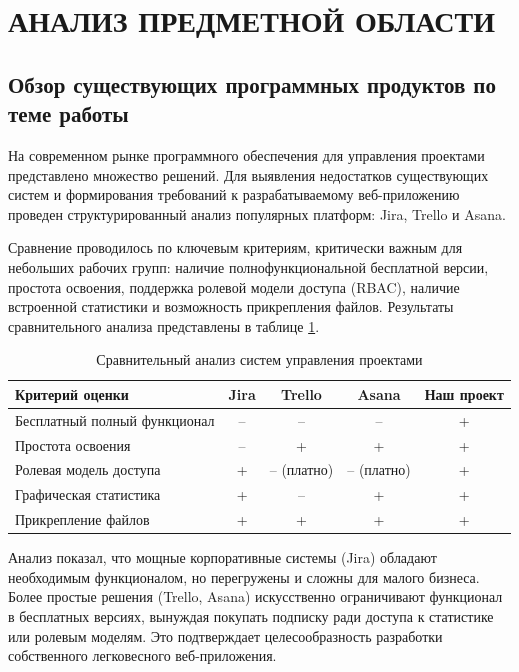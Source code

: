 \section{АНАЛИЗ ПРЕДМЕТНОЙ ОБЛАСТИ}

\subsection{Обзор существующих программных продуктов по теме работы}

На современном рынке программного обеспечения для управления проектами представлено множество решений. Для выявления недостатков существующих систем и формирования требований к разрабатываемому веб-приложению проведен структурированный анализ популярных платформ: Jira, Trello и Asana. 

Сравнение проводилось по ключевым критериям, критически важным для небольших рабочих групп: наличие полнофункциональной бесплатной версии, простота освоения, поддержка ролевой модели доступа (RBAC), наличие встроенной статистики и возможность прикрепления файлов. Результаты сравнительного анализа представлены в таблице \ref{tab:competitors}.

\begin{table}[h!]
\centering
\caption{Сравнительный анализ систем управления проектами}
\label{tab:competitors}
\begin{tabular}{|p{}|c|c|c|c|}
\hline
\textbf{Критерий оценки} & \textbf{Jira} & \textbf{Trello} & \textbf{Asana} & \textbf{Наш проект} \\
\hline
Бесплатный полный функционал & -- & -- & -- & + \\
\hline
Простота освоения & -- & + & + & + \\
\hline
Ролевая модель доступа & + & -- (платно) & -- (платно) & + \\
\hline
Графическая статистика & + & -- & + & + \\
\hline
Прикрепление файлов & + & + & + & + \\
\hline
\end{tabular}
\end{table}

Анализ показал, что мощные корпоративные системы (Jira) обладают необходимым функционалом, но перегружены и сложны для малого бизнеса. Более простые решения (Trello, Asana) искусственно ограничивают функционал в бесплатных версиях, вынуждая покупать подписку ради доступа к статистике или ролевым моделям. Это подтверждает целесообразность разработки собственного легковесного веб-приложения.

